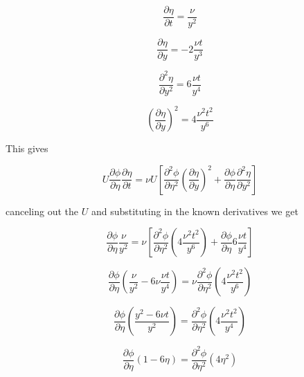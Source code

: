 \begin{equation*}
  \frac{\partial\eta}{\partial{}t}=\frac{\nu}{y^{2}}
\end{equation*}

\begin{equation*}
  \frac{\partial\eta}{\partial{}y}=-2\frac{\nu{}t}{y^{3}}
\end{equation*}

\begin{equation*}
  \frac{\partial^{2}\eta}{\partial{}y^{2}}=6\frac{\nu{}t}{y^{4}}
\end{equation*}

\begin{equation*}
  \left(\frac{\partial\eta}{\partial{}y}\right)^{2}=4\frac{\nu^{2}t^{2}}{y^{6}}
\end{equation*}

This gives

\begin{equation*}
  U\frac{\partial\phi}{\partial\eta}\frac{\partial\eta}{\partial{}t}=\nu{}U\left[\frac{\partial^{2}\phi}{\partial\eta^{2}}\left(\frac{\partial\eta}{\partial{}y}\right)^{2}+\frac{\partial\phi}{\partial\eta}\frac{\partial^{2}\eta}{\partial{}y^{2}}\right]
\end{equation*}

canceling out the $U$ and substituting in the known derivatives we get

\begin{equation*}
  \frac{\partial\phi}{\partial\eta}\frac{\nu}{y^{2}}=\nu{}\left[\frac{\partial^{2}\phi}{\partial\eta^{2}}\left(4\frac{\nu^{2}t^{2}}{y^{6}}\right)+\frac{\partial\phi}{\partial\eta}6\frac{\nu{}t}{y^{4}}\right]
\end{equation*}

\begin{equation*}
  \frac{\partial\phi}{\partial\eta}\left(\frac{\nu}{y^{2}}-6\nu\frac{\nu{}t}{y^{4}}\right)=\nu\frac{\partial^{2}\phi}{\partial\eta^{2}}\left(4\frac{\nu^{2}t^{2}}{y^{6}}\right)
\end{equation*}

\begin{equation*}
  \frac{\partial\phi}{\partial\eta}\left(\frac{y^{2}-6\nu{}t}{y^{2}}\right)=\frac{\partial^{2}\phi}{\partial\eta^{2}}\left(4\frac{\nu^{2}t^{2}}{y^{4}}\right)
\end{equation*}

\begin{equation*}
  \frac{\partial\phi}{\partial\eta}\left(1-6\eta\right)=\frac{\partial^{2}\phi}{\partial\eta^{2}}\left(4\eta^{2}\right)
\end{equation*}

